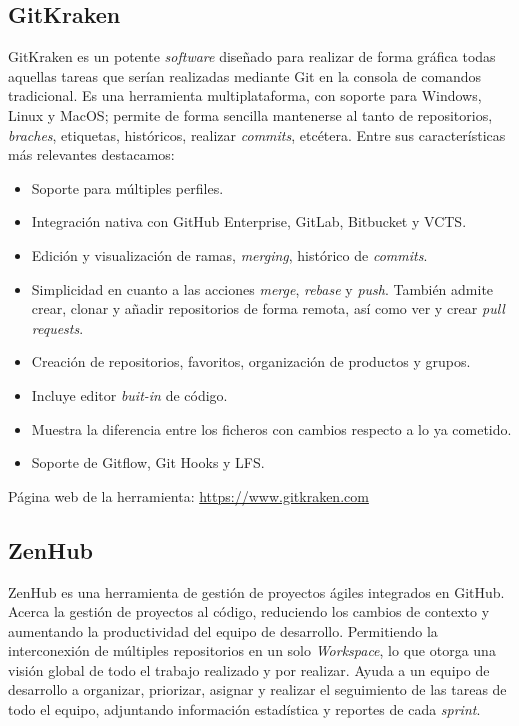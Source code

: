 \subsection{GitKraken}
GitKraken es un potente \textit{software} diseñado para realizar de forma gráfica todas aquellas tareas que serían realizadas mediante Git en la consola de comandos tradicional. Es una herramienta multiplataforma, con soporte para Windows, Linux y MacOS; permite de forma sencilla mantenerse al tanto de repositorios, \textit{braches}, etiquetas, históricos, realizar \textit{commits}, etcétera. Entre sus características más relevantes destacamos:
\begin{itemize}
\item Soporte para múltiples perfiles.
\item Integración nativa con GitHub Enterprise, GitLab, Bitbucket y VCTS.
\item Edición y visualización de ramas, \textit{merging}, histórico de \textit{commits}.
\item Simplicidad en cuanto a las acciones \textit{merge}, \textit{rebase} y \textit{push}. También admite crear, clonar y añadir repositorios de forma remota, así como ver y crear \textit{pull requests}.
\item Creación de repositorios, favoritos, organización de productos y grupos.
\item Incluye editor \textit{buit-in} de código. 
\item Muestra la diferencia entre los ficheros con cambios respecto a lo ya cometido.
\item Soporte de Gitflow, Git Hooks y LFS.
\end{itemize}

Página web de la herramienta: \url{https://www.gitkraken.com}

\subsection{ZenHub}
ZenHub es una herramienta de gestión de proyectos ágiles integrados en GitHub. Acerca la gestión de proyectos al código, reduciendo los cambios de contexto y aumentando la productividad del equipo de desarrollo. Permitiendo la interconexión de múltiples repositorios en un solo \textit{Workspace}, lo que otorga una visión global de todo el trabajo realizado y por realizar. Ayuda a un equipo de desarrollo a organizar, priorizar, asignar y realizar el seguimiento de las tareas de todo el equipo, adjuntando información estadística y reportes de cada \textit{sprint}.

